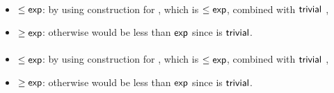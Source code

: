 \paragraph{\ODLA{}\tto\ONFA}
\begin{itemize}
	\item $\le\mathsf{exp}$: by using construction for \hyperref[cost:1DLAto1DFA]{\ODLA{}\tto\ODFA}, which is $\le\mathsf{exp}$, combined with $\mathsf{trivial}$ \ODFA{}\tto\ONFA,
	\item $\ge\mathsf{exp}$: otherwise \hyperref[cost:1DLAto2NFA]{\ODLA{}\tto\TNFA} would be less than $\mathsf{exp}$ since \ONFA{}\tto\TNFA is $\mathsf{trivial}$.
\end{itemize}
\paragraph{\ODLA{}\tto\TDFA}
\begin{itemize}
	\item $\le\mathsf{exp}$: by using construction for \hyperref[cost:1DLAto1DFA]{\ODLA{}\tto\ODFA}, which is $\le\mathsf{exp}$, combined with $\mathsf{trivial}$ \ODFA{}\tto\TDFA,
	\item $\ge\mathsf{exp}$: otherwise \hyperref[cost:1DLAto2NFA]{\ODLA{}\tto\TNFA} would be less than $\mathsf{exp}$ since \TDFA{}\tto\TNFA is $\mathsf{trivial}$.
\end{itemize}


